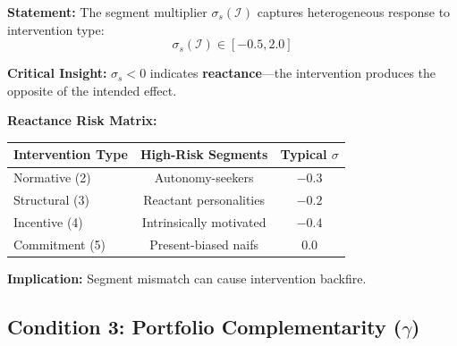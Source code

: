 \begin{tcolorbox}[colback=gray!5!white, colframe=gray!75!black,
    title=EIH Condition 2: Segment Fit (from HHH Axiom HHH-A5)]

\textbf{Statement:} The segment multiplier $\sigma_s(\mathcal{I})$ captures
heterogeneous response to intervention type:
\begin{equation}
\sigma_s(\mathcal{I}) \in [-0.5, 2.0]
\label{eq:sigma-range}
\end{equation}

\textbf{Critical Insight:} $\sigma_s < 0$ indicates \textbf{reactance}---the
intervention produces the opposite of the intended effect.

\textbf{Reactance Risk Matrix:}
\begin{center}
\renewcommand{\arraystretch}{1.2}
\begin{tabular}{@{}lcc@{}}
\toprule
\textbf{Intervention Type} & \textbf{High-Risk Segments} & \textbf{Typical $\sigma$} \\
\midrule
Normative (2) & Autonomy-seekers & $-0.3$ \\
Structural (3) & Reactant personalities & $-0.2$ \\
Incentive (4) & Intrinsically motivated & $-0.4$ \\
Commitment (5) & Present-biased naifs & $0.0$ \\
\bottomrule
\end{tabular}
\end{center}

\textbf{Implication:} Segment mismatch can cause intervention backfire.
\end{tcolorbox}

\subsection{Condition 3: Portfolio Complementarity ($\gamma$)}

